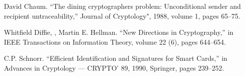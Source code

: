 \documentclass[a4paper, 10pt, conference]{ieeeconf}
\begin{document}
\begin{thebibliography}{99}
 David Chaum. ``The dining cryptographers problem: Unconditional sender and recipient untraceability,'' Journal of Cryptology", 1988, volume 1, pages 65--75.

 Whitfield Diffie, , Martin E. Hellman. ``New Directions in Cryptography,''   in IEEE Transactions on Information Theory, volume 22 (6), pages 644--654. 

 C.P. Schnorr. ``Efficient Identification and Signatures for Smart Cards,''
in Advances in Cryptology --- CRYPTO' 89, 1990, Springer, pages 239--252.

\end{thebibliography}
\end{document}
